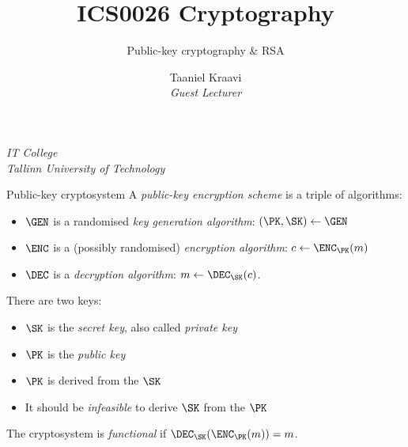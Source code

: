 

\usepackage{csquotes}

\usepackage{graphicx}
\graphicspath{ {../../images/} }

\usetikzlibrary{positioning,calc,external}

\usepackage{crysymb}

\usepackage{soul}

\usetikzlibrary{positioning,calc}
\graphicspath{ {../../images/} }

\title[Short version of title]{ICS0026 Cryptography}
\subtitle{Public-key cryptography \& RSA}
\author%
{%
    {Taaniel Kraavi}\\
    \textit{\footnotesize Guest Lecturer}
}
\institute%
{%
    \textit{IT College}\\
    \textit{Tallinn University of Technology}
}


\begin{frame}
  \titlepage
\end{frame}

\begin{frame}{Public-key cryptosystem}
  A \emph{public-key encryption scheme} is a triple of algorithms:
  \begin{itemize}[<+(1)->]
    \pause\item $\GEN$ is a randomised \emph{key generation algorithm}: $(\PK,\SK)\gets\GEN$
    \pause\item $\ENC$ is a (possibly randomised) \emph{encryption algorithm}: $c\gets\ENC_\PK(m)$
    \pause\item $\DEC$ is a \emph{decryption algorithm}: $m\gets\DEC_\SK(c)$.
  \end{itemize}

  \pause
  There are two keys:
  \begin{itemize}[<+(1)->]
    \item $\SK$ is the \emph{secret key}, also called \emph{private key}
    \item $\PK$ is the \emph{public key}
    \item $\PK$ is derived from the $\SK$
    \item It should be \emph{infeasible} to derive $\SK$ from the $\PK$
  \end{itemize}

  \pause
  The cryptosystem is \emph{functional} if $\DEC_\SK(\ENC_\PK(m))=m$.
\end{frame}

